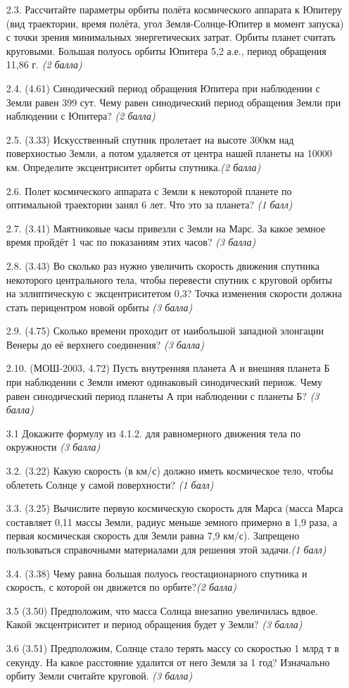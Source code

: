 \documentclass[16pt,a4paper]{report}
\begin{document}
\begin{enumerate}
    \item [2.3.] Рассчитайте параметры орбиты полёта космического аппарата к Юпитеру (вид траектории, время полёта, угол Земля-Солнце-Юпитер в момент запуска) с точки зрения минимальных энергетических затрат. Орбиты планет считать круговыми. Большая полуось орбиты Юпитера 5,2 а.е., период обращения 11,86 г. \emph{(2 балла)}
    \item [2.4.] (4.61) Синодический период обращения Юпитера при наблюдении с Земли равен 399 сут. Чему равен синодический период обращения Земли при наблюдении с Юпитера? \emph{(2 балла)}
    \item [2.5.] (3.33) Искусственный спутник пролетает на высоте 300км над поверхностью Земли, а потом удаляется от центра нашей планеты на 10000 км. Определите эксцентриситет орбиты спутника.\emph{(2 балла)}
    \item [2.6.] Полет космического аппарата с Земли к некоторой планете по оптимальной траектории занял 6 лет. Что это за планета? \emph{(1 балл)}
    \item [2.7.] (3.41) Маятниковые часы привезли с Земли на Марс. За какое земное время пройдёт 1 час по показаниям этих часов? \emph{(3 балла)}
    \item [2.8.] (3.43) Во сколько раз нужно увеличить скорость движения спутника некоторого центрального тела, чтобы перевести спутник с круговой орбиты на эллиптическую с эксцентриситетом 0,3? Точка изменения скорости должна стать перицентром новой орбиты \emph{(3 балла)}
    \item [2.9.] (4.75) Сколько времени проходит от наибольшой западной элонгации Венеры до её верхнего соединения? \emph{(3 балла)}
    \item[2.10.] (МОШ-2003, 4.72) Пусть внутренняя планета А и внешняя планета Б при наблюдении с Земли имеют одинаковый синодический периож. Чему равен синодический период планеты А при наблюдении с планеты Б? \emph{(3 балла)}
    \item [3.1] Докажите формулу из 4.1.2. для равномерного движения тела по окружности \emph{(3 балла)}
    \item [3.2.] (3.22) Какую скорость (в км/с) должно иметь космическое тело, чтобы облететь Солнце у самой поверхности? \emph{(1 балл)}
    \item [3.3.] (3.25) Вычислите первую космическую скорость для Марса (масса Марса составляет 0,11 массы Земли, радиус меньше земного примерно в 1,9 раза, а первая космическая скорость для Земли равна 7,9 км/с). Запрещено пользоваться справочными материалами для решения этой задачи.\emph{(1 балл)}
    \item [3.4.] (3.38) Чему равна большая полуось геостационарного спутника и скорость, с которой он движется по орбите?\emph{(2 балла)}
    \item [3.5] (3.50) Предположим, что масса Солнца внезапно увеличилась вдвое. Какой эксцентриситет и период обращения будет у Земли? \emph{(3 балла)}
    \item [3.6] (3.51) Предположим, Солнце стало терять массу со скоростью 1 млрд т в секунду. На какое расстояние удалится от него Земля за 1 год? Изначально орбиту Земли считайте круговой. \emph{(3 балла)}
\end{enumerate}
\end{document}
